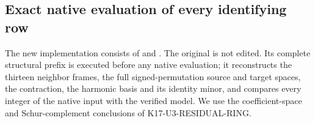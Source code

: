 \subsection{Exact native evaluation of every identifying row}
\label{sec:kt-native-full-rows}

The new implementation consists of
 and
.  The original
 is not edited.  Its complete
structural prefix is executed before any native evaluation; it
reconstructs the thirteen neighbor frames, the full signed-permutation
source and target spaces, the contraction, the harmonic basis and
its identity minor, and compares every integer of the native input
 with the verified model.  We use the coefficient-space
and Schur-complement conclusions of K17-U3-RESIDUAL-RING.

